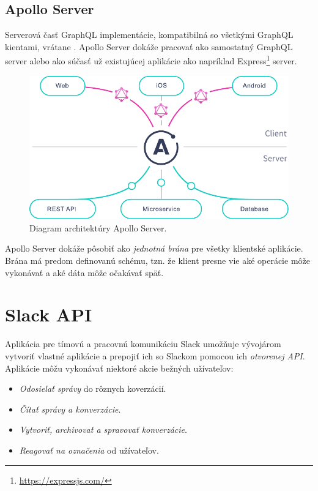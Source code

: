 \subsection{Apollo Server}
Serverová časť GraphQL implementácie, kompatibilná so všetkými GraphQL kientami, vrátane . Apollo Server dokáže pracovať ako samostatný GraphQL server alebo ako súčasť už existujúcej aplikácie ako napríklad Express\footnote{\href{https://expressjs.com/}{https://expressjs.com/}} server. \cite{Apollo} \\

\begin{figure}[h]
	\centering
	\includegraphics[scale=0.8]{obrazky-figures/apollo_server_diagram}
	\caption{Diagram architektúry Apollo Server. \cite{Apollo}}
\end{figure}

\noindent Apollo Server dokáže pôsobiť ako \emph{jednotná brána} pre všetky klientské aplikácie. Brána má predom definovanú schému, tzn. že klient presne vie aké operácie môže vykonávať a aké dáta môže očakávať späť.

\section{Slack API}
\label{section:slack_api}
Aplikácia pre tímovú a pracovnú komunikáciu Slack umožňuje vývojárom vytvoriť vlastné aplikácie a prepojiť ich so Slackom pomocou ich \emph{otvorenej API}. \cite{SlackAPI} \\

\noindent Aplikácie môžu vykonávať niektoré akcie bežných užívateľov:

\begin{itemize}
	\item \emph{Odosielať správy} do rôznych koverzácií. \cite{SlackAPI}
	\item \emph{Čítať správy a konverzácie}. \cite{SlackAPI}
	\item \emph{Vytvoriť, archivovať a spravovať konverzácie}. \cite{SlackAPI}
	\item \emph{Reagovať na označenia} od užívateľov. \cite{SlackAPI}
\end{itemize}

